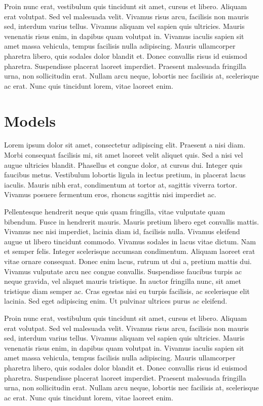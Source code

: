 \documentclass[titlepage,a4paper,12pt,thmsb]{report}
\begin{document}
Proin nunc erat, vestibulum quis tincidunt sit amet, cursus et libero. Aliquam erat volutpat. Sed vel malesuada velit. Vivamus risus arcu, facilisis non mauris sed, interdum varius tellus. Vivamus aliquam vel sapien quis ultricies. Mauris venenatis risus enim, in dapibus quam volutpat in. Vivamus iaculis sapien sit amet massa vehicula, tempus facilisis nulla adipiscing. Mauris ullamcorper pharetra libero, quis sodales dolor blandit et. Donec convallis risus id euismod pharetra. Suspendisse placerat laoreet imperdiet. Praesent malesuada fringilla urna, non sollicitudin erat. Nullam arcu neque, lobortis nec facilisis at, scelerisque ac erat. Nunc quis tincidunt lorem, vitae laoreet enim.


\chapter{Models}

Lorem ipsum dolor sit amet, consectetur adipiscing elit. Praesent a nisi diam. Morbi consequat facilisis mi, sit amet laoreet velit aliquet quis. Sed a nisi vel augue ultricies blandit. Phasellus et congue dolor, at cursus dui. Integer quis faucibus metus. Vestibulum lobortis ligula in lectus pretium, in placerat lacus iaculis. Mauris nibh erat, condimentum at tortor at, sagittis viverra tortor. Vivamus posuere fermentum eros, rhoncus sagittis nisi imperdiet ac.

Pellentesque hendrerit neque quis quam fringilla, vitae vulputate quam bibendum. Fusce in hendrerit mauris. Mauris pretium libero eget convallis mattis. Vivamus nec nisi imperdiet, lacinia diam id, facilisis nulla. Vivamus eleifend augue ut libero tincidunt commodo. Vivamus sodales in lacus vitae dictum. Nam et semper felis. Integer scelerisque accumsan condimentum. Aliquam laoreet erat vitae ornare consequat. Donec enim lacus, rutrum ut dui a, pretium mattis dui. Vivamus vulputate arcu nec congue convallis. Suspendisse faucibus turpis ac neque gravida, vel aliquet mauris tristique. In auctor fringilla nunc, sit amet tristique diam semper ac. Cras egestas nisi eu turpis facilisis, ac scelerisque elit lacinia. Sed eget adipiscing enim. Ut pulvinar ultrices purus ac eleifend.

Proin nunc erat, vestibulum quis tincidunt sit amet, cursus et libero. Aliquam erat volutpat. Sed vel malesuada velit. Vivamus risus arcu, facilisis non mauris sed, interdum varius tellus. Vivamus aliquam vel sapien quis ultricies. Mauris venenatis risus enim, in dapibus quam volutpat in. Vivamus iaculis sapien sit amet massa vehicula, tempus facilisis nulla adipiscing. Mauris ullamcorper pharetra libero, quis sodales dolor blandit et. Donec convallis risus id euismod pharetra. Suspendisse placerat laoreet imperdiet. Praesent malesuada fringilla urna, non sollicitudin erat. Nullam arcu neque, lobortis nec facilisis at, scelerisque ac erat. Nunc quis tincidunt lorem, vitae laoreet enim.
\end{document}
